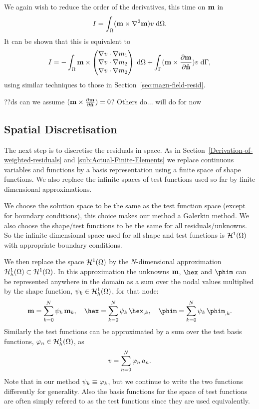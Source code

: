 We again wish to reduce the order of the derivatives, this time on $\mathbf{m}$ in
\begin{equation}
  I = \int_\Omega (\mathbf{m} \times \nabla^2 \mathbf{m}) v {\; \text{d}}\Omega.
  \label{eq:46}
\end{equation}
It can be shown that this is equivalent to
\begin{equation}
  \label{eq:49}
  I = - \int_\Omega  \mathbf{m} \times \begin{pmatrix} \nabla v \cdot \nabla m_1 \\ \nabla v \cdot \nabla m_2 \\ \nabla v \cdot \nabla m_2 \end{pmatrix} {\; \text{d}}\Omega + \int_{\Gamma} (\mathbf{m} \times \frac{\partial \mathbf{m}}{\partial \mathbf{\hat{n}}}) v {\; \text{d}}{\Gamma},
\end{equation}
using similar techniques to those in Section~\ref{sec:magn-field-resid}. %

??ds can we assume $(\mathbf{m} \times \frac{\partial \mathbf{m}}{\partial \mathbf{\hat{n}}}) = 0$? Others do... will do for now

\subsection{Spatial Discretisation}
\label{sec:spat-discr-resi}

The next step is to discretise the residuals in space. As in Section~\ref{Derivation-of-weighted-residuals} and \ref{sub:Actual-Finite-Elements} we replace continuous variables and functions by a basis representation using a finite space of shape functions. We also replace the infinite spaces of test functions used so far by finite dimensional approximations.

We choose the solution space to be the same as the test function space (except for boundary conditions), this choice makes our method a Galerkin method. We also choose the shape/test functions to be the same for all residuals/unknowns. So the infinite dimensional space used for all shape and test functions is $\mathcal{H}^1(\Omega)$ with appropriate boundary conditions.

We then replace the space $\mathcal{H}^1(\Omega)$ by the $N$-dimensional approximation ${\mathcal{H}^1_h(\Omega)} \subset \mathcal{H}^1(\Omega)$. In this approximation the unknowns $\mathbf{m}$, $\hex$ and $\phim$ can be represented anywhere in the domain as a sum over the nodal values multiplied by the shape function, ${\psi_k} \in {\mathcal{H}^1_h(\Omega)}$, for that node:
\begin{gather} %
  \mv = \sum_{k = 0}^{N} \sk \, \mv_k, \quad
  \hex = \sum_{k = 0}^{N} \sk \, \hex_{,k}, \quad
  \phim = \sum_{k = 0}^{N} \sk \, \phim_{,k}.
  \label{eq:unknowns-basis}
\end{gather}
Similarly the test functions can be approximated by a sum over the test basis functions, ${\varphi_n} \in {\mathcal{H}^1_h(\Omega)}$, as
\begin{equation}
  \label{eq:47}
  v = \sum_{n = 0}^{N} {\varphi_n} \, a_n.
\end{equation}
Note that in our method $\psi_k \equiv \varphi_k$, but we continue to write the two functions differently for generality. Also the basis functions for the space of test functions are often simply refered to as the test functions since they are used equivalently.

